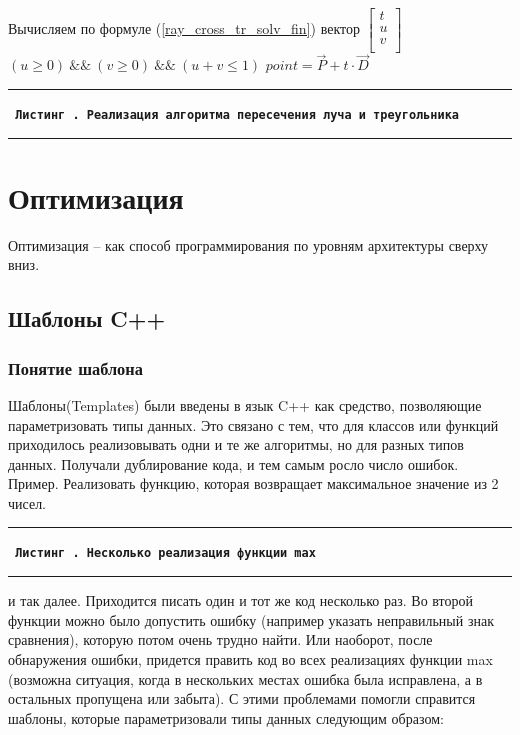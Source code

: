 \documentclass[12pt, a4paper]{article}
\newcommand{\HRule}{\noindent\rule{\linewidth}{0.45mm}}
\newcounter{sourcecode}
\newcommand*{\cppsource}[2]{\par{\HRule \small \tt \bf \noindent \ Листинг \arabic{sourcecode}. {\rm \small #2} \vspace{0.25cm}}%
\addtocounter{sourcecode}{1}  \HRule}
\begin{document}
\begin{codebox}
\li Вычисляем по формуле (\ref{ray_cross_tr_solv_fin}) вектор $\left[ \begin{array}{c} t \\ u \\ v \\ \end{array} \right]$
\li \If $(u \geq 0) \ \&\& \ (v \geq 0) \ \&\& \ (u + v \leq 1)$
\li \Then $point = \vec{P} + t \cdot \vec{D}$
\end{codebox}

\cppsource{src/triangle.tex}{Реализация алгоритма пересечения луча и треугольника}


\newpage
\section{Оптимизация}
Оптимизация -- как способ программирования по уровням архитектуры сверху вниз.

\subsection{Шаблоны C++}

\subsubsection{Понятие шаблона}

Шаблоны(Templates) были введены в язык C++ как средство, позволяющие параметризовать типы данных. Это связано с тем, что для классов или функций приходилось реализовывать одни и те же алгоритмы, но для разных типов данных. Получали дублирование кода, и тем самым росло число ошибок. 
Пример. Реализовать функцию, которая возвращает максимальное значение из 2 чисел.

\cppsource{src/deftemplate.tex}{Несколько реализация функции {\bf max}}

\noindent
и так далее. Приходится писать один и тот же код несколько раз. Во второй функции можно было допустить ошибку (например указать неправильный знак сравнения), которую потом очень трудно найти. Или наоборот, после обнаружения ошибки, придется править код во всех реализациях функции max (возможна ситуация, когда в нескольких местах ошибка была исправлена, а в остальных пропущена или забыта). С этими проблемами помогли справится шаблоны, которые параметризовали типы данных следующим образом:
\end{document}
